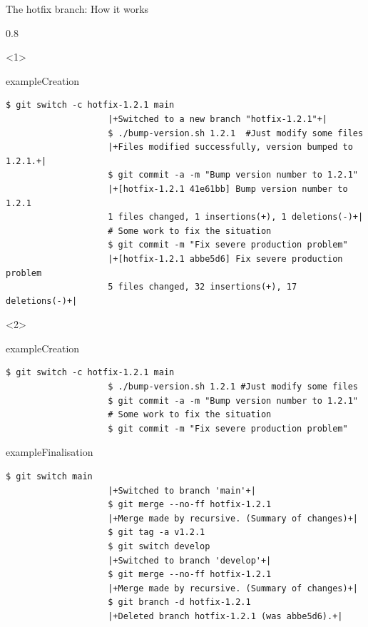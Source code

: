 \begin{frame}[fragile,c]{The hotfix branch: How it works}
    \vspace{-6mm}
    \begin{overlayarea}{\textwidth}{0.8\textheight}
        \begin{onlyenv}<1>
            \begin{varblock}{example}{Creation}
                \begin{lstlisting}[style=MyBash]
                    $ git switch -c hotfix-1.2.1 main
                    |+Switched to a new branch "hotfix-1.2.1"+|
                    $ ./bump-version.sh 1.2.1  #Just modify some files
                    |+Files modified successfully, version bumped to 1.2.1.+|
                    $ git commit -a -m "Bump version number to 1.2.1"
                    |+[hotfix-1.2.1 41e61bb] Bump version number to 1.2.1
                    1 files changed, 1 insertions(+), 1 deletions(-)+|
                    # Some work to fix the situation
                    $ git commit -m "Fix severe production problem"
                    |+[hotfix-1.2.1 abbe5d6] Fix severe production problem
                    5 files changed, 32 insertions(+), 17 deletions(-)+|
                \end{lstlisting}
            \end{varblock}
        \end{onlyenv}
        \begin{onlyenv}<2>
            \begin{varblock}{example}{Creation}
                \begin{lstlisting}[style=MyBash]
                    $ git switch -c hotfix-1.2.1 main
                    $ ./bump-version.sh 1.2.1 #Just modify some files
                    $ git commit -a -m "Bump version number to 1.2.1"
                    # Some work to fix the situation
                    $ git commit -m "Fix severe production problem"
                \end{lstlisting}
            \end{varblock}
            \vspace{-3mm}
            \begin{varblock}{example}{Finalisation}
                \begin{lstlisting}[style=MyBash]
                    $ git switch main
                    |+Switched to branch 'main'+|
                    $ git merge --no-ff hotfix-1.2.1
                    |+Merge made by recursive. (Summary of changes)+|
                    $ git tag -a v1.2.1
                    $ git switch develop
                    |+Switched to branch 'develop'+|
                    $ git merge --no-ff hotfix-1.2.1
                    |+Merge made by recursive. (Summary of changes)+|
                    $ git branch -d hotfix-1.2.1
                    |+Deleted branch hotfix-1.2.1 (was abbe5d6).+|
                \end{lstlisting}
            \end{varblock}
        \end{onlyenv}
    \end{overlayarea}
\end{frame}
